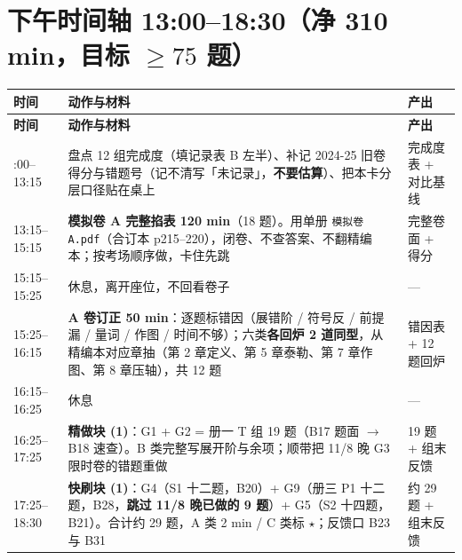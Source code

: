 \documentclass[11pt,a4paper]{ctexart}
\begin{document}
\section{下午时间轴 13:00--18:30（净 310 min，目标 $\geq 75$ 题）}
{\small
\setlength{\tabcolsep}{3pt}
\renewcommand{\arraystretch}{1.06}
\begin{longtable}{@{}p{2.15cm}p{9.55cm}p{3.6cm}@{}}
\toprule
\textbf{时间} & \textbf{动作与材料} & \textbf{产出} \\
\midrule
\endfirsthead
\toprule
\textbf{时间} & \textbf{动作与材料} & \textbf{产出} \\
\midrule
\endhead
\bottomrule
\endlastfoot
13:00--13:15 & 盘点 12 组完成度（填记录表 B 左半）、补记 2024-25 旧卷得分与错题号（记不清写「未记录」，\textbf{不要估算}）、把本卡分层口径贴在桌上 & 完成度表 + 对比基线 \\
13:15--15:15 & \textbf{模拟卷 A 完整掐表 120 min}（18 题）。用单册 \texttt{模拟卷A.pdf}（合订本 p215--220），闭卷、不查答案、不翻精编本；按考场顺序做，卡住先跳 & 完整卷面 + 得分 \\
15:15--15:25 & 休息，离开座位，不回看卷子 & --- \\
15:25--16:15 & \textbf{A 卷订正 50 min}：逐题标错因（展错阶 / 符号反 / 前提漏 / 量词 / 作图 / 时间不够）；六类\textbf{各回炉 2 道同型}，从精编本对应章抽（第 2 章定义、第 5 章泰勒、第 7 章作图、第 8 章压轴），共 12 题 & 错因表 + 12 题回炉 \\
16:15--16:25 & 休息 & --- \\
16:25--17:25 & \textbf{精做块 (1)}：G1 + G2 = 册一 T 组 19 题（B17 题面 $\to$ B18 速查）。B 类完整写展开阶与余项；顺带把 11/8 晚 G3 限时卷的错题重做 & 19 题 + 组末反馈 \\
17:25--18:30 & \textbf{快刷块 (1)}：G4（S1 十二题，B20）+ G9（册三 P1 十二题，B28，\textbf{跳过 11/8 晚已做的 9 题}）+ G5（S2 十四题，B21）。合计约 29 题，A 类 2 min / C 类标 $\star$；反馈口 B23 与 B31 & 约 29 题 + 组末反馈 \\
\end{longtable}
}
\end{document}
